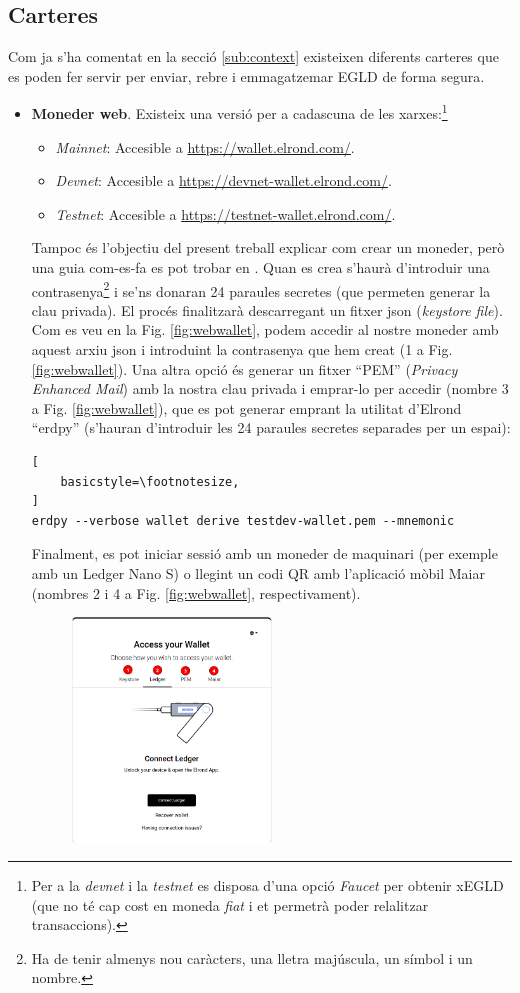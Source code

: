 \documentclass[11pt,a4paper]{article}
\begin{document}
\subsection{Carteres}
Com ja s'ha comentat en la secció \ref{sub:context} existeixen diferents carteres que es poden fer servir per enviar, rebre i emmagatzemar EGLD de forma segura.
\begin{itemize}
\item \textbf{Moneder web}. Existeix una versió per a cadascuna de les xarxes:\footnote{Per a la \textit{devnet} i la \textit{testnet} es disposa d'una opció \textit{Faucet} per obtenir xEGLD (que no té cap cost en moneda \textit{fiat} i et permetrà poder relalitzar transaccions).}
	\begin{itemize}
	\item \textit{Mainnet}: Accesible a \url{https://wallet.elrond.com/}.
	\item \textit{Devnet}: Accesible a \url{https://devnet-wallet.elrond.com/}.
	\item \textit{Testnet}: Accesible a \url{https://testnet-wallet.elrond.com/}.
	\end{itemize}
Tampoc és l'objectiu del present treball explicar com crear un moneder, però una guia com-es-fa es pot trobar en \cite{elrond2022}. Quan es crea s'haurà d'introduir una contrasenya\footnote{Ha de tenir almenys nou caràcters, una lletra majúscula, un símbol i un nombre.} i se'ns donaran 24 paraules secretes (que permeten generar la clau privada). El procés finalitzarà descarregant un fitxer json (\textit{keystore file}). Com es veu en la Fig. \ref{fig:webwallet}, podem accedir al nostre moneder amb aquest arxiu json i introduint la contrasenya que hem creat (1 a Fig. \ref{fig:webwallet}). Una altra opció és generar un fitxer ``PEM'' (\textit{Privacy Enhanced Mail}) amb la nostra clau privada i emprar-lo per accedir (nombre 3 a Fig. \ref{fig:webwallet}), que es pot generar emprant la utilitat d'Elrond ``erdpy'' (s'hauran d'introduir les 24 paraules secretes separades per un espai):
\begin{lstlisting}[
    basicstyle=\footnotesize,
]
erdpy --verbose wallet derive testdev-wallet.pem --mnemonic
\end{lstlisting}
Finalment, es pot iniciar sessió amb un moneder de maquinari (per exemple amb un Ledger Nano S) o llegint un codi QR amb l'aplicació mòbil Maiar (nombres 2 i 4 a Fig. \ref{fig:webwallet}, respectivament).
\begin{figure}[h]
\includegraphics[width=0.5\textwidth]{webwallet.png}

\end{figure}
\end{itemize}
\end{document}
